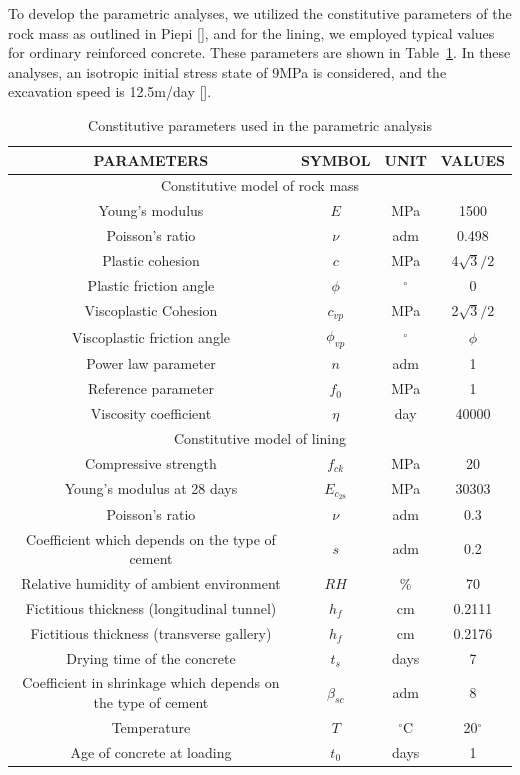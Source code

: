\documentclass[a4paper,fleqn]{cas-sc}
\begin{document}
To develop the parametric analyses, we utilized the constitutive parameters of the rock mass as outlined in Piepi [], and for the lining, we employed typical values for ordinary reinforced concrete. These parameters are shown in Table~\ref{table2}. In these analyses, an isotropic initial stress state of 9MPa is considered, and the excavation speed is 12.5m/day [].
\begin{table}
	\caption{Constitutive parameters used in the parametric analysis}
	\label{table2}
	\centering
	\renewcommand{\arraystretch}{1.25}
	\begin{tabular}{c c c c}
		\hline
		\multicolumn{1}{c}{PARAMETERS} &
		\multicolumn{1}{c}{SYMBOL} &
		\multicolumn{1}{c}{UNIT} &
		\multicolumn{1}{c}{VALUES} \\
		\hline
		\multicolumn{4}{c}{Constitutive model of rock mass} \\
		\hline
		Young's modulus & $E$ & MPa & 1500 \\
		Poisson's ratio & $\nu$ & adm & 0.498 \\
		Plastic cohesion & $c$ & MPa & 4$\sqrt{3}/2$ \\
		Plastic friction angle & $\phi$ & $^{\circ}$ & 0 \\
		Viscoplastic Cohesion & $c_{vp}$ & MPa & 2$\sqrt{3}/2$ \\
		Viscoplastic friction angle & $\phi_{vp}$ & $^{\circ}$ & $\phi$ \\
		Power law parameter & $n$ & adm & 1 \\
		Reference parameter & $f_0$ & MPa & 1 \\
		Viscosity coefficient & $\eta$ & day & 40000 \\
		\hline
		\multicolumn{4}{c}{Constitutive model of lining} \\
		\hline
		
		Compressive strength & $f_{ck}$ & MPa & 20 \\
		Young's modulus at 28 days & $E_{c_{28}}$ & MPa & $30303$ \\
		Poisson's ratio & $\nu$ & adm & 0.3 \\
		
		Coefficient which depends on the type of cement & $s$ & adm & 0.2 \\
		Relative humidity of ambient environment & $RH$ & \% & 70 \\
		Fictitious thickness (longitudinal tunnel) & $h_f$ & cm & 0.2111 \\
		Fictitious thickness (transverse gallery) & $h_f$ & cm & 0.2176 \\
		Drying time of the concrete & $t_s$ & days & 7 \\
		Coefficient in shrinkage which depends on the type of cement & $\beta_{sc}$ & adm & 8 \\
		Temperature & $T$ & $^\circ$C & 20$^\circ$ \\
		Age of concrete at loading & $t_0$ & days & 1 \\
		\hline
	\end{tabular}
	\normalsize
\end{table}
\end{document}

